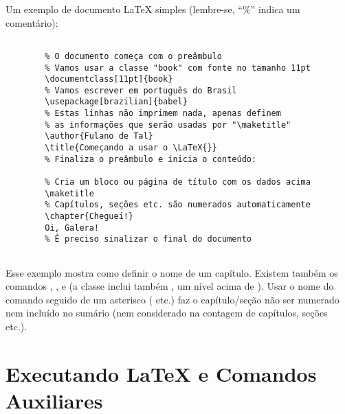 Um exemplo de documento \LaTeX{} simples (lembre-se, ``\%'' indica um comentário):

\begin{verbatim}

        % O documento começa com o preâmbulo
        % Vamos usar a classe "book" com fonte no tamanho 11pt
        \documentclass[11pt]{book}
        % Vamos escrever em português do Brasil
        \usepackage[brazilian]{babel}
        % Estas linhas não imprimem nada, apenas definem
        % as informações que serão usadas por "\maketitle"
        \author{Fulano de Tal}
        \title{Começando a usar o \LaTeX{}}
        % Finaliza o preâmbulo e inicia o conteúdo:
        
        % Cria um bloco ou página de título com os dados acima
        \maketitle
        % Capítulos, seções etc. são numerados automaticamente
        \chapter{Cheguei!}
        Oi, Galera!
        % É preciso sinalizar o final do documento
        

\end{verbatim}

Esse exemplo mostra como definir o nome de um capítulo. Existem também os
comandos , ,  e
 (a classe  inclui também , um nível
acima de ). Usar o nome do comando seguido de um asterisco
( etc.) faz o capítulo/seção não ser numerado nem incluído
no sumário (nem considerado na contagem de capítulos, seções etc.).

\section{Executando \LaTeX{} e Comandos Auxiliares}

